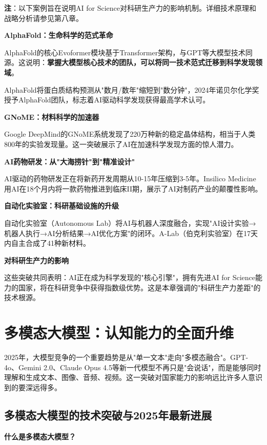 \textbf{注}：以下案例旨在说明AI for Science对科研生产力的影响机制。详细技术原理和战略分析请参见第八章。

\textbf{AlphaFold：生命科学的范式革命}

AlphaFold的核心Evoformer模块基于Transformer架构，与GPT等大模型技术同源。这说明：\textbf{掌握大模型核心技术的团队，可以将同一技术范式迁移到科学发现领域}。

AlphaFold将蛋白质结构预测从"数月/数年"缩短到"数分钟"，2024年诺贝尔化学奖授予AlphaFold团队，标志着AI驱动科学发现获得最高学术认可。

\textbf{GNoME：材料科学的加速器}

Google DeepMind的GNoME系统发现了220万种新的稳定晶体结构，相当于人类800年的实验发现量。这一突破展示了AI在加速科学发现方面的惊人潜力。

\textbf{AI药物研发：从"大海捞针"到"精准设计"}

AI驱动的药物研发正在将新药开发周期从10-15年压缩到3-5年。Insilico Medicine用AI在18个月内将一款药物推进到临床II期，展示了AI对制药产业的颠覆性影响。

\textbf{自动化实验室：科研基础设施的升级}

自动化实验室（Autonomous Lab）将AI与机器人深度融合，实现"AI设计实验→机器人执行→AI分析结果→AI优化方案"的闭环。A-Lab（伯克利实验室）在17天内自主合成了41种新材料。

\textbf{对科研生产力的影响}

这些突破共同表明：AI正在成为科学发现的"核心引擎"，拥有先进AI for Science能力的国家，将在科研竞争中获得指数级优势。这是本章强调的"科研生产力差距"的技术根源。


\section{多模态大模型：认知能力的全面升维}

2025年，大模型竞争的一个重要趋势是从"单一文本"走向"多模态融合"。GPT-4o、Gemini 2.0、Claude Opus 4.5等新一代模型不再只是"会说话"，而是能够同时理解和生成文本、图像、音频、视频。这一突破对国家能力的影响远比许多人意识到的要深远得多。

\subsection{多模态大模型的技术突破与2025年最新进展}

\textbf{什么是多模态大模型？}

